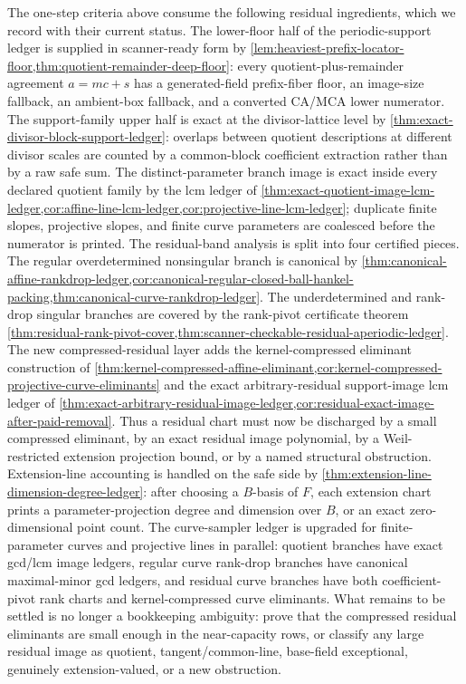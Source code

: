 \documentclass[11pt]{article}
\theoremstyle{definition}
\theoremstyle{remark}
\begin{document}
The one-step criteria above consume the following residual ingredients, which we
record with their current status.  The lower-floor half of the periodic-support
ledger is supplied in scanner-ready form by
\cref{lem:heaviest-prefix-locator-floor,thm:quotient-remainder-deep-floor}: every
quotient-plus-remainder agreement $a=mc+s$ has a generated-field prefix-fiber
floor, an image-size fallback, an ambient-box fallback, and a converted CA/MCA
lower numerator.  The support-family upper half is exact at the divisor-lattice
level by \cref{thm:exact-divisor-block-support-ledger}: overlaps between quotient
descriptions at different divisor scales are counted by a common-block
coefficient extraction rather than by a raw safe sum.  The distinct-parameter
branch image is exact inside every declared quotient family by the lcm ledger of
\cref{thm:exact-quotient-image-lcm-ledger,cor:affine-line-lcm-ledger,cor:projective-line-lcm-ledger}; duplicate finite slopes, projective slopes, and
finite curve parameters are coalesced before the numerator is printed.  The
residual-band analysis is split into four certified pieces.  The regular overdetermined nonsingular branch
is canonical by \cref{thm:canonical-affine-rankdrop-ledger,cor:canonical-regular-closed-ball-hankel-packing,thm:canonical-curve-rankdrop-ledger}.  The underdetermined
and rank-drop singular branches are covered by the rank-pivot certificate theorem
\cref{thm:residual-rank-pivot-cover,thm:scanner-checkable-residual-aperiodic-ledger}.  The new compressed-residual layer adds the kernel-compressed eliminant construction of
\cref{thm:kernel-compressed-affine-eliminant,cor:kernel-compressed-projective-curve-eliminants} and the exact arbitrary-residual support-image lcm ledger of
\cref{thm:exact-arbitrary-residual-image-ledger,cor:residual-exact-image-after-paid-removal}.  Thus a residual chart must now be discharged by a small compressed
eliminant, by an exact residual image polynomial, by a Weil-restricted extension
projection bound, or by a named structural obstruction.  Extension-line
accounting is handled on the safe side by
\cref{thm:extension-line-dimension-degree-ledger}: after choosing a $B$-basis of
$F$, each extension chart prints a parameter-projection degree and dimension over
$B$, or an exact zero-dimensional point count.  The curve-sampler ledger is
upgraded for finite-parameter curves and projective lines in parallel: quotient branches have exact gcd/lcm
image ledgers, regular curve rank-drop branches have canonical maximal-minor gcd
ledgers, and residual curve branches have both coefficient-pivot rank charts and
kernel-compressed curve eliminants.  What remains to be settled is no longer a bookkeeping
ambiguity: prove that the compressed residual eliminants are small enough in the
near-capacity rows, or classify any large residual image as quotient,
tangent/common-line, base-field exceptional, genuinely extension-valued, or a new
obstruction.
\end{document}

